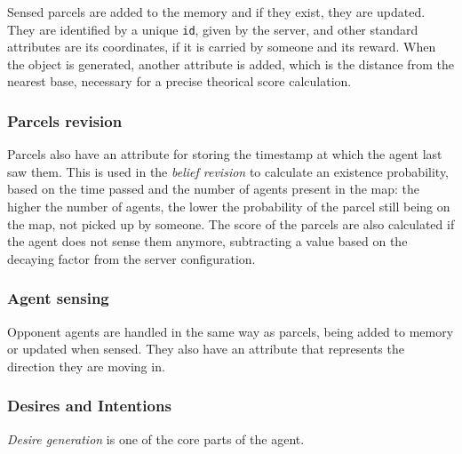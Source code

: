 Sensed parcels are added to the memory and if they exist, they are updated. They are identified by a unique \texttt{id}, given by the server, and other standard attributes are its coordinates, if it is carried by someone and its reward.
When the object is generated, another attribute is added, which is the distance from the nearest base, necessary for a precise theorical score calculation.

\subsubsection*{Parcels revision}
Parcels also have an attribute for storing the timestamp at which the agent last saw them. This is used in the \textit{belief revision} to calculate an existence probability, based on the time passed and the number of agents present in the map: the higher the number of agents, the lower the probability of the parcel still being on the map, not picked up by someone.
The score of the parcels are also calculated if the agent does not sense them anymore, subtracting a value based on the decaying factor from the server configuration.

\subsubsection*{Agent sensing}
Opponent agents are handled in the same way as parcels, being added to memory or updated when sensed. They also have an attribute that represents the direction they are moving in.

\subsubsection*{Desires and Intentions}
\textit{Desire generation} is one of the core parts of the agent.

